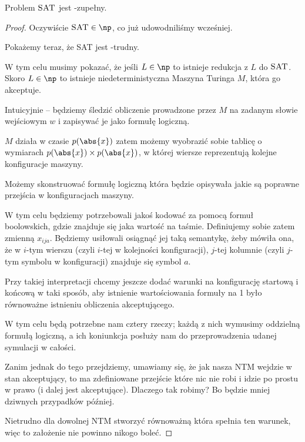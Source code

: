 \begin{theorem}
    Problem \( \textsc{SAT} \) jest \np-zupełny.
\end{theorem}
\begin{proof}
    Oczywiście \( \textsc{SAT} \in \np \), co już udowodniliśmy wcześniej.
    
    Pokażemy teraz, że \textsc{SAT} jest \np-trudny.
    
    W tym celu musimy pokazać, że jeśli \( L \in \np \) to istnieje redukcja z \( L \) do \( \textsc{SAT} \).
    Skoro \( L \in \np \) to istnieje niedeterministyczna Maszyna Turinga \( M \), która go akceptuje. 
    
    Intuicyjnie -- będziemy śledzić obliczenie prowadzone przez \( M \) na zadanym słowie wejściowym \( w \) i zapisywać je jako formułę logiczną.
    
    \( M \) działa w czasie \( p(\abs{x}) \) zatem możemy wyobrazić sobie tablicę o wymiarach \( p(\abs{x}) \times p(\abs{x}) \), w której wiersze reprezentują kolejne konfiguracje maszyny.

    Możemy skonstruować formułę logiczną która będzie opisywała jakie są poprawne przejścia w konfiguracjach maszyny.
    
    W tym celu będziemy potrzebowali jakoś kodować za pomocą formuł boolowskich, gdzie znajduje się jaka wartość na taśmie. Definiujemy sobie zatem zmienną \( x_{ija} \). Będziemy usiłowali osiągnąć jej taką semantykę, żeby mówiła ona, że w \(i\)-tym wierszu (czyli \(i\)-tej w kolejności konfiguracji), \(j\)-tej kolumnie (czyli \(j\)-tym symbolu w konfiguracji) znajduje się symbol \(a\). 
    
    Przy takiej interpretacji chcemy jeszcze dodać warunki na konfigurację startową i końcową w taki sposób, aby istnienie wartościowania formuły na 1 było równoważne istnieniu obliczenia akceptującego.
    
    W tym celu będą potrzebne nam cztery rzeczy; każdą z nich wymusimy oddzielną formułą logiczną, a ich koniunkcja posłuży nam do przeprowadzenia udanej symulacji w całości.
    
    Zanim jednak do tego przejdziemy, umawiamy się, że jak nasza NTM wejdzie w stan akceptujący, to ma zdefiniowane przejście które nic nie robi i idzie po prostu w prawo (i dalej jest akceptujące). Dlaczego tak robimy? Bo będzie mniej dziwnych przypadków później. 
    
    Nietrudno dla dowolnej NTM stworzyć równoważną która spełnia ten warunek, więc to założenie nie powinno nikogo boleć. 
    

\end{proof}
